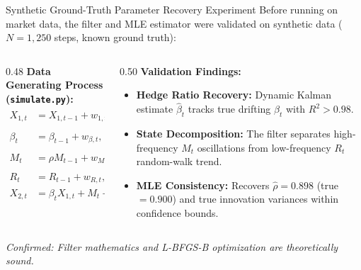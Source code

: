 \documentclass[10pt, aspectratio=169]{beamer}
\begin{document}
\begin{frame}{Synthetic Ground-Truth Parameter Recovery Experiment}
  Before running on market data, the filter and MLE estimator were validated on synthetic data ($N = 1{,}250$ steps, known ground truth):
  \vspace{4pt}
  \begin{columns}[T]
    \begin{column}{0.48\textwidth}
      \textbf{Data Generating Process (\texttt{simulate.py}):}
      \begin{align*}
        X_{1,t} &= X_{1,t-1} + w_{1,t}, \quad w_{1,t} \sim \mathcal{N}(0, \sigma_{X_1}^2) \\
        \beta_t &= \beta_{t-1} + w_{\beta,t}, \quad w_{\beta,t} \sim \mathcal{N}(0, q_\beta^2) \\
        M_t &= \rho M_{t-1} + w_{M,t}, \quad w_{M,t} \sim \mathcal{N}(0, \sigma_M^2) \\
        R_t &= R_{t-1} + w_{R,t}, \quad w_{R,t} \sim \mathcal{N}(0, \sigma_R^2) \\
        X_{2,t} &= \beta_t X_{1,t} + M_t + R_t + v_{2,t}
      \end{align*}
    \end{column}
    \begin{column}{0.50\textwidth}
      \textbf{Validation Findings:}
      \begin{itemize}
        \item \textbf{Hedge Ratio Recovery:} Dynamic Kalman estimate $\hat{\beta}_t$ tracks true drifting $\beta_t$ with $R^2 > 0.98$.
        \item \textbf{State Decomposition:} The filter separates high-frequency $M_t$ oscillations from low-frequency $R_t$ random-walk trend.
        \item \textbf{MLE Consistency:} Recovers $\hat{\rho} = 0.898$ (true $= 0.900$) and true innovation variances within confidence bounds.
      \end{itemize}
    \end{column}
  \end{columns}
  \vspace{4pt}
  \begin{center}
    \textit{Confirmed: Filter mathematics and L-BFGS-B optimization are theoretically sound.}
  \end{center}
\end{frame}

\end{document}
